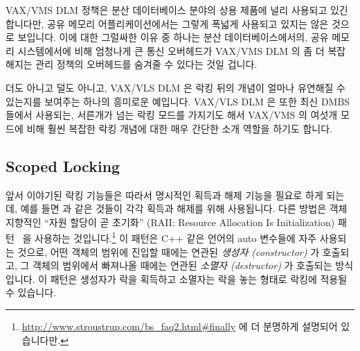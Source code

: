 VAX/VMS DLM 정책은 분산 데이터베이스 분야의 상용 제품에 널리 사용되고 있긴
합니다만, 공유 메모리 어플리케이션에서는 그렇게 폭넓게 사용되고 있지는 않은
것으로 보입니다.
이에 대한 그럴싸한 이유 중 하나는 분산 데이터베이스에서의, 공유 메모리
시스템에서에 비해 엄청나게 큰 통신 오버헤드가 VAX/VMS DLM 의 좀 더 복잡해지는
관리 정책의 오버헤드를 숨겨줄 수 있다는 것일 겁니다.

더도 아니고 덜도 아니고, VAX/VLS DLM 은 락킹 뒤의 개념이 얼마나 유연해질 수
있는지를 보여주는 하나의 흥미로운 예입니다.
VAX/VLS DLM 은 또한 최신 DMBS 들에서 사용되는, 서른개가 넘는 락킹 모드를
가지기도 해서 VAX/VMS 의 여섯개 모드에 비해 훨씬 복잡한 락킹 개념에 대한 매우
간단한 소개 역할을 하기도 합니다.

\subsection{Scoped Locking}
\label{sec:locking:Scoped Locking}

앞서 이야기된 락킹 기능들은 따라서 명시적인 획득과 해제 기능을 필요로 하게
되는데, 예를 들면  과  같은 것들이 각각
획득과 해제를 위해 사용됩니다.
다른 방법은 객체 지향적인 ``자원 할당이 곧 초기화'' (RAII: Resource Allocation
Is Initialization) 패턴~\cite{MargaretAEllis1990Cplusplus} 을 사용하는
것입니다.\footnote{
	\url{http://www.stroustrup.com/bs_faq2.html\#finally} 에 더 분명하게
	설명되어 있습니다만.}
이 패턴은 C++ 같은 언어의 auto 변수들에 자주 사용되는 것으로, 어떤 객체의
범위에 진입할 때에는 연관된 \emph{생성자 (constructor)} 가 호출되고, 그 객체의
범위에서 빠져나올 때에는 연관된 \emph{소멸자 (destructor)} 가 호출되는
방식입니다.
이 패턴은 생성자가 락을 획득하고 소멸자는 락을 놓는 형태로 락킹에 적용될 수
있습니다.

